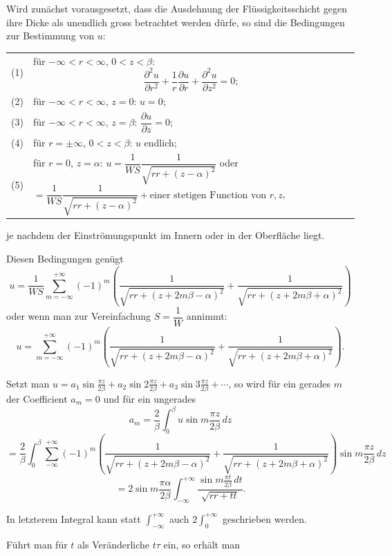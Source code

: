 \documentclass[12pt,a4paper]{book}
\theoremstyle{definition}
\theoremstyle{remark}
\begin{document}
Wird zunächst vorausgesetzt, dass die Ausdehnung der Flüssigkeitsschicht gegen ihre Dicke als unendlich gross betrachtet werden dürfe, so sind die Bedingungen zur Bestimmung von $u$:

\medskip
\begin{tabular}{@{}l@{\quad}p{}@{}}
(1) & für $-\infty < r < \infty$, $0 < z < \beta$:
\[\frac{\partial^2 u}{\partial r^2} + \frac{1}{r}\frac{\partial u}{\partial r} + \frac{\partial^2 u}{\partial z^2} = 0;\] \\[0.5em]
(2) & für $-\infty < r < \infty$, $z = 0$: $u = 0$; \\[0.3em]
(3) & für $-\infty < r < \infty$, $z = \beta$: $\dfrac{\partial u}{\partial z} = 0$; \\[0.5em]
(4) & für $r = \pm\infty$, $0 < z < \beta$: $u$ endlich; \\[0.3em]
(5) & für $r = 0$, $z = \alpha$: $u = \dfrac{1}{WS}\dfrac{1}{\sqrt{rr + (z - \alpha)^2}}$ oder $= \dfrac{1}{WS}\dfrac{1}{\sqrt{rr + (z - \alpha)^2}} + \text{einer stetigen Function von } r, z$,
\end{tabular}
\medskip

\noindent je nachdem der Einströmungspunkt im Innern oder in der Oberfläche liegt.

Diesen Bedingungen genügt
\[
u = \frac{1}{WS} \sum_{m=-\infty}^{+\infty} (-1)^m \left( \frac{1}{\sqrt{rr + (z + 2m\beta - \alpha)^2}} + \frac{1}{\sqrt{rr + (z + 2m\beta + \alpha)^2}} \right)
\]
oder wenn man zur Vereinfachung $S = \dfrac{1}{W}$ annimmt:
\[
u = \sum_{m=-\infty}^{+\infty} (-1)^m \left( \frac{1}{\sqrt{rr + (z + 2m\beta - \alpha)^2}} + \frac{1}{\sqrt{rr + (z + 2m\beta + \alpha)^2}} \right).
\]

Setzt man $u = a_1 \sin \frac{\pi z}{2\beta} + a_2 \sin 2\frac{\pi z}{2\beta} + a_3 \sin 3\frac{\pi z}{2\beta} + \cdots$, so wird für ein gerades $m$ der Coefficient $a_m = 0$ und für ein ungerades
\[
a_m = \frac{2}{\beta} \int_0^\beta u \sin m\frac{\pi z}{2\beta}\, dz
\]
\[
= \frac{2}{\beta} \int_0^\beta \sum_{-\infty}^{+\infty} (-1)^m \left( \frac{1}{\sqrt{rr + (z + 2m\beta - \alpha)^2}} + \frac{1}{\sqrt{rr + (z + 2m\beta + \alpha)^2}} \right) \sin m\frac{\pi z}{2\beta}\, dz
\]
\[
= 2 \sin m\frac{\pi \alpha}{2\beta} \int_{-\infty}^{+\infty} \frac{\sin m\frac{\pi t}{2\beta}\, dt}{\sqrt{rr + tt}}.
\]

In letzterem Integral kann statt $\int_{-\infty}^{+\infty}$ auch $2\int_0^{+\infty}$ geschrieben werden.

Führt man für $t$ als Veränderliche $t\tau$ ein, so erhält man
\end{document}

